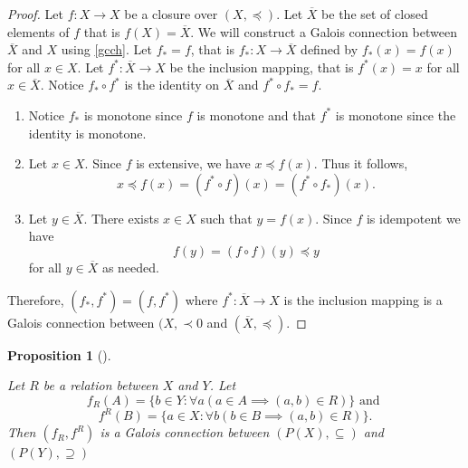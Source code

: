 \documentclass[
  twoside,
  12pt,
  letterpaper,
  fleqn]{article}
\theoremstyle{plain}
\newtheorem{proposition}{Proposition}[section]
\theoremstyle{definition}
\theoremstyle{definition}
\theoremstyle{remark}
\begin{document}
\begin{proof}

Let \(f:X\to X\) be a closure over \((X,\preceq)\). Let \(\overline{X}\)
be the set of closed elements of \(f\) that is \(f(X)=\overline{X}\). We
will construct a Galois connection between \(\overline{X}\) and \(X\)
using \eqref{gcch}. Let \(f_*=f\), that is \(f_*:X\to \overline{X}\)
defined by \(f_*(x)=f(x)\) for all \(x\in X\). Let
\(f^*:\overline{X}\to X\) be the inclusion mapping, that is \(f^*(x)=x\)
for all \(x\in \overline{X}\). Notice \(f_*\circ f^*\) is the identity
on \(\overline{X}\) and \(f^*\circ f_*=f\).

\begin{enumerate}
\item
Notice $f_*$ is monotone since $f$ is monotone and that $f^*$ is monotone since the identity is monotone. 
\item
Let $x\in X$. 
Since $f$ is extensive, we have $x\preceq f(x)$. 
Thus it follows,
\[
x\preceq f(x)=(f^*\circ f)(x)=(f^*\circ f_*)(x).
\]
\item
Let $y\in \overline{X}$. 
There exists $x\in X$ such that $y=f(x)$. 
Since $f$ is idempotent we have
\[
f(y)=(f\circ f)(y)\preceq y
\]
for all $y\in \overline{X}$ as needed.
\end{enumerate}

Therefore, \((f_*,f^*)=(f,f^*)\) where \(f^*:\overline{X}\to X\) is the
inclusion mapping is a Galois connection between \((X,\prec0\) and
\((\overline{X},\preceq)\).

\end{proof}

\begin{proposition}[]\protect\hypertarget{prp-}{}\label{prp-}

\label{gcrel} Let \(R\) be a relation between \(X\) and \(Y\). Let
\begin{equation}
\label{gcrel1}
f_R(A)=\{b\in Y:\forall a (a\in A\implies (a,b)\in R) \} \text{ and }
\end{equation} \begin{equation}
\label{gcrel2}
f^R(B)=\{a\in X:\forall b (b\in B\implies (a,b)\in R) \}.
\end{equation} Then \((f_R, f^R)\) is a Galois connection between
\((P(X),\subseteq)\) and \((P(Y),\supseteq)\)

\end{proposition}
\end{document}
